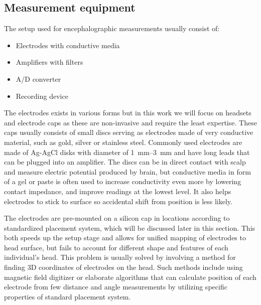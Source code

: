 \subsection{Measurement equipment}
The setup used for encephalographic measurements usually consist of: 
\begin{itemize}
  \item Electrodes with conductive media
  \item Amplifiers with filters
  \item A/D converter
  \item Recording device
\end{itemize}
The electrodes exists in various forms but in this work we will focus on
headsets and electrode caps as these are non-invasive and require the least
expertise. These caps usually consists of small discs serving as electrodes made
of very conductive material, such as gold, silver or stainless steel. Commonly
used electrodes are made of Ag-AgCl disks with diameter of \SIrange[range-units
= single]{1}{3}{\mm} and have long leads that can be plugged into an
amplifier. \cite{eegFund} The discs can be in direct contact with scalp and
measure electric potential produced by brain, but conductive media in form of a
gel or paste is often used to increase conductivity even more by lowering
contact impedance, and improve readings at the lowest level. It also helps
electrodes to stick to surface so accidental shift from position is less likely.

The electrodes are pre-mounted on a silicon cap in locations according to
standardized placement system, which will be discussed later in this section.
This both speeds up the setup stage and allows for unified mapping of electrodes
to head surface, but fails to account for different shape and features of each
individual's head. \cite{eegFund} This problem is usually solved by involving a
method for finding 3D coordinates of electrodes on the head. Such methods
include using magnetic field digitizer or elaborate algorithms that can
calculate position of each electrode from few distance and angle measurements by
utilizing specific properties of standard placement system. \cite{rapidPos}

